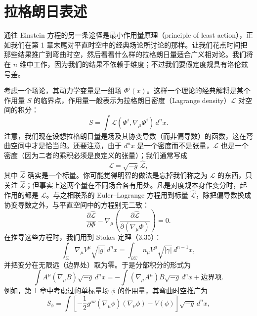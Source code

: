 \section{拉格朗日表述}

通往 Einstein 方程的另一条途径是最小作用量原理（principle of least action），正如我们在第 1 章末尾对平直时空中的经典场论所讨论的那样。让我们花点时间把那些结果推广到弯曲时空，然后看看什么样的拉格朗日量适合广义相对论。我们将在 $n$ 维中工作，因为我们的结果不依赖于维度；不过我们要假定度规具有洛伦兹号差。

考虑一个场论，其动力学变量是一组场 $\Phi^i(x)$。这样一个理论的经典解将是某个作用量 $S$ 的临界点，作用量一般表示为拉格朗日密度（Lagrange density）$\mathcal{L}$ 对空间的积分：
\begin{equation*}
S = \int \mathcal{L}(\Phi^i, \nabla_\mu\Phi^i)\, d^nx.
\tag{4.47}
\end{equation*}
注意，我们现在设想拉格朗日量是场及其协变导数（而非偏导数）的函数，这在弯曲空间中才是恰当的。还要注意，由于 $d^nx$ 是一个密度而不是张量，$\mathcal{L}$ 也是一个密度（因为二者的乘积必须是良定义的张量）；我们通常写成
\begin{equation*}
\mathcal{L} = \sqrt{-g}\,\widehat{\mathcal{L}},
\tag{4.48}
\end{equation*}
其中 $\widehat{\mathcal{L}}$ 确实是一个标量。你可能觉得明智的做法是忘掉我们称之为 $\mathcal{L}$ 的东西，只关注 $\widehat{\mathcal{L}}$；但事实上这两个量在不同场合各有用处。凡是对度规本身作变分时，起作用的都是 $\mathcal{L}$。与之相联系的 Euler--Lagrange 方程用到标量 $\widehat{\mathcal{L}}$，除把偏导数换成协变导数之外，与平直空间中的方程别无二致：
\begin{equation*}
\frac{\partial\widehat{\mathcal{L}}}{\partial\Phi} - \nabla_\mu\left(\frac{\partial\widehat{\mathcal{L}}}{\partial(\nabla_\mu\Phi)}\right) = 0.
\tag{4.49}
\end{equation*}
在推导这些方程时，我们用到 Stokes 定理（3.35）：
\begin{equation*}
\int_\Sigma \nabla_\mu V^\mu\sqrt{|g|}\, d^nx = \int_{\partial\Sigma} n_\mu V^\mu\sqrt{|\gamma|}\, d^{n-1}x,
\tag{4.50}
\end{equation*}
并把变分在无限远（边界处）取为零。于是分部积分的形式为
\begin{equation*}
\int A^\mu(\nabla_\mu B)\sqrt{-g}\, d^nx = -\int (\nabla_\mu A^\mu)B\sqrt{-g}\, d^nx + \text{边界项}.
\tag{4.51}
\end{equation*}
例如，第 1 章中考虑过的单标量场 $\phi$ 的作用量，其弯曲时空推广为
\begin{equation*}
S_\phi = \int\left[-\frac{1}{2}g^{\mu\nu}(\nabla_\mu\phi)(\nabla_\nu\phi) - V(\phi)\right]\sqrt{-g}\, d^nx,
\tag{4.52}
\end{equation*}
